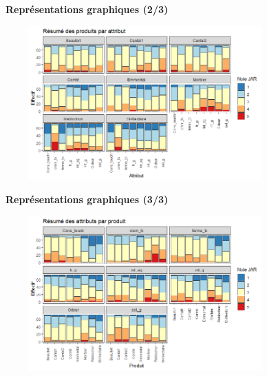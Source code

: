 \documentclass[aspectratio=169,xcolor=dvipsnames]{beamer}
\begin{document}

\begin{frame}
\textcolor{nyubluedarker}{\faChartBar \ \textbf{Représentations graphiques (2/3)}}

	\begin{figure}
	\centering
	\includegraphics[width=0.8\textwidth]{distrib_notesJAR_attribut.png}
	\end{figure}

\end{frame}


\begin{frame}
\textcolor{nyubluedarker}{\faChartBar \ \textbf{Représentations graphiques (3/3)}}

	\begin{figure}
	\centering
	\includegraphics[width=0.8\textwidth]{distrib_notesJAR_produit.png}
	\end{figure}

\end{frame}
\end{document}
